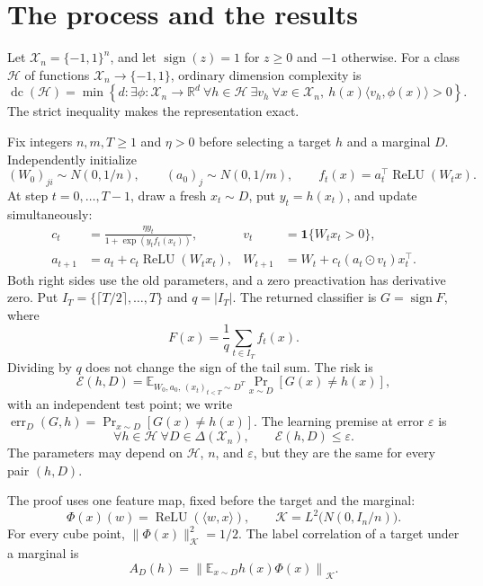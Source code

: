 \documentclass[11pt,letterpaper,pmlr,twoside]{jmlr}
\newcommand{\R}{\mathbb R}\newcommand{\E}{\mathbb E}
\newcommand{\X}{\mathcal X}\newcommand{\Hc}{\mathcal H}
\newcommand{\Kc}{\mathcal K}\newcommand{\sgn}{\operatorname{sign}}
\newcommand{\relu}{\operatorname{ReLU}}\newcommand{\dc}{\operatorname{dc}}
\newcommand{\err}{\operatorname{err}}\newcommand{\Risk}{\mathcal E}
\newcommand{\ind}{\mathbf1}\newcommand{\eps}{\varepsilon}
\newcommand{\ip}[2]{\langle #1,#2\rangle}\newcommand{\norm}[1]{\lVert #1\rVert}
\begin{document}
\section{The process and the results}
\label{sec:setting}
Let $\X_n=\{-1,1\}^n$, and let $\sgn(z)=1$ for $z\ge0$ and $-1$ otherwise. For a class $\Hc$ of functions $\X_n\to\{-1,1\}$, ordinary dimension complexity is
\begin{equation}
 \dc(\Hc)=\min\left\{d:\exists\phi:\X_n\to\R^d\
 \forall h\in\Hc\ \exists v_h\ \forall x\in\X_n,
 \ h(x)\ip{v_h}{\phi(x)}>0\right\}.
 \label{eq:dc}
\end{equation}
The strict inequality makes the representation exact.

Fix integers $n,m,T\ge1$ and $\eta>0$ before selecting a target $h$ and a marginal $D$. Independently initialize
\begin{equation}
 (W_0)_{ji}\sim N(0,1/n),\qquad (a_0)_j\sim N(0,1/m),
 \qquad f_t(x)=a_t^\top\relu(W_tx).
 \label{eq:init}
\end{equation}
At step $t=0,\ldots,T-1$, draw a fresh $x_t\sim D$, put $y_t=h(x_t)$, and update simultaneously:
\begin{equation}
 \begin{aligned}
 c_t&=\frac{\eta y_t}{1+\exp(y_tf_t(x_t))},
 &v_t&=\ind\{W_tx_t>0\},\\
 a_{t+1}&=a_t+c_t\relu(W_tx_t),
 &W_{t+1}&=W_t+c_t(a_t\odot v_t)x_t^\top.
 \end{aligned}
 \label{eq:actual}
\end{equation}
Both right sides use the old parameters, and a zero preactivation has derivative zero. Put $I_T=\{\lceil T/2\rceil,\ldots,T\}$ and $q=|I_T|$. The returned classifier is $G=\sgn F$, where
\begin{equation}
 F(x)=\frac1q\sum_{t\in I_T}f_t(x).
 \label{eq:tail}
\end{equation}
Dividing by $q$ does not change the sign of the tail sum. The risk is
\[
 \Risk(h,D)=\E_{W_0,a_0,\,(x_t)_{t<T}\sim D^T}
       \Pr_{x\sim D}[G(x)\ne h(x)],
\]
with an independent test point; we write $\err_D(G,h)=\Pr_{x\sim D}[G(x)\ne h(x)]$. The learning premise at error $\eps$ is
\begin{equation}
 \forall h\in\Hc\ \forall D\in\Delta(\X_n),\qquad \Risk(h,D)\le\eps.
 \label{eq:premise}
\end{equation}
The parameters may depend on $\Hc$, $n$, and $\eps$, but they are the same for every pair $(h,D)$.

The proof uses one feature map, fixed before the target and the marginal:
\begin{equation}
 \Phi(x)(w)=\relu(\ip wx),\qquad
 \Kc=L^2\bigl(N(0,I_n/n)\bigr).
 \label{eq:Hilbert}
\end{equation}
For every cube point, $\norm{\Phi(x)}_{\Kc}^2=1/2$. The label correlation of a target under a marginal is
\begin{equation}
 A_D(h)=\left\|\E_{x\sim D}h(x)\Phi(x)\right\|_{\Kc}.
 \label{eq:alignment}
\end{equation}
\end{document}
